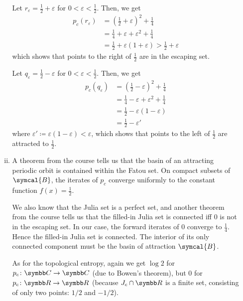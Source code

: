 \begin{problem}
\begin{enumerate}[a)]
\begin{enumerate}[i)]
        Let \(r_{\varepsilon} = \frac{1}{2} + \varepsilon\) for \(0 < \varepsilon < \frac{1}{2}\). Then, we get
        \begin{align*}
            p_c \left(r_{\varepsilon}\right) &= \left(\frac{1}{2} + \varepsilon\right)^2 + \frac{1}{4} \\
            &= \frac{1}{4} + \varepsilon + \varepsilon^2 + \frac{1}{4} \\
            &= \frac{1}{2} + \varepsilon(1 + \varepsilon) > \frac{1}{2} + \varepsilon
        \end{align*}
        which shows that points to the right of \(\frac{1}{2}\) are in the escaping set.

        Let \(q_{\varepsilon} = \frac{1}{2} - \varepsilon\) for \(0 < \varepsilon < \frac{1}{2}\). Then, we get
        \begin{align*}
            p_c \left(q_{\varepsilon}\right) &= \left(\frac{1}{2} - \varepsilon\right)^2 + \frac{1}{4} \\
            &= \frac{1}{4} - \varepsilon + \varepsilon^2 + \frac{1}{4} \\
            &= \frac{1}{2} - \varepsilon(1 - \varepsilon) \\
            &= \frac{1}{2} - \varepsilon'
        \end{align*}
        where \(\varepsilon' \coloneq \varepsilon (1 - \varepsilon) < \varepsilon\), which shows that points to the left of \(\frac{1}{2}\) are attracted to \(\frac{1}{2}\).

        \item A theorem from the course tells us that the basin of an attracting periodic orbit is contained within the Fatou set. On compact subsets of \(\symcal{B}\), the iterates of \(p_c\) converge uniformly to the constant function \(f(x) = \frac{1}{2}\).

        We also know that the Julia set is a perfect set, and another theorem from the course tells us that the filled-in Julia set is connected iff \(0\) is not in the escaping set. In our case, the forward iterates of \(0\) converge to \(\frac{1}{4}\). Hence the filled-in Julia set is connected. The interior of its only connected component must be the basin of attraction \(\symcal{B}\).

        As for the topological entropy, again we get \(\log 2\) for \(p_c \colon \complex \to \complex\) (due to Bowen's theorem), but \(0\) for \(p_c \colon \reals \to \reals\) (because \(J_c \cap \reals\) is a finite set, consisting of only two points: \(1/2\) and \(-1/2\)).
    \end{enumerate}
\end{enumerate}
\end{problem}

